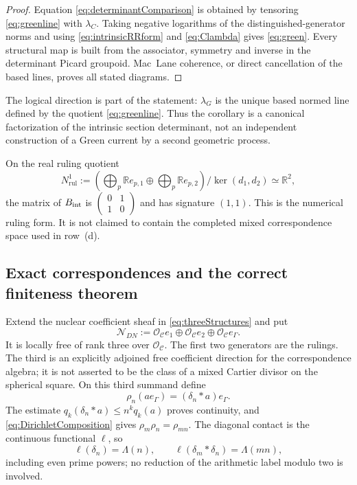 \documentclass[11pt]{amsart}
\theoremstyle{definition}
\theoremstyle{remark}
\newcommand{\R}{\mathbb R}
\begin{document}
\begin{proof}
Equation \eqref{eq:determinantComparison} is obtained by tensoring
\eqref{eq:greenline} with $\lambda_C$.  Taking negative logarithms of the
distinguished-generator norms and using \eqref{eq:intrinsicRRform} and
\eqref{eq:Clambda} gives \eqref{eq:green}.  Every structural map is built
from the associator, symmetry and inverse in the determinant Picard
groupoid.  Mac~Lane coherence, or direct cancellation of the based lines,
proves all stated diagrams.
\end{proof}

The logical direction is part of the statement: $\lambda_G$ is the unique
based normed line defined by the quotient \eqref{eq:greenline}.  Thus the
corollary is a canonical factorization of the intrinsic section determinant,
not an independent construction of a Green current by a second geometric
process.

On the real ruling quotient
\begin{equation}\label{eq:rulingquotient}
 N^1_{\mathrm{rul}}:=
 \left(\bigoplus_p\R e_{p,1}\oplus\bigoplus_p\R e_{p,2}\right)
       /\ker(d_1,d_2)\simeq\R^2,
\end{equation}
the matrix of $B_{\rm int}$ is
$\left(\begin{smallmatrix}0&1\\1&0\end{smallmatrix}\right)$ and has
signature $(1,1)$.  This is the numerical ruling form.  It is not claimed
to contain the completed mixed correspondence space used in row~(d).

\subsection{Exact correspondences and the correct finiteness theorem}

Extend the nuclear coefficient sheaf in \eqref{eq:threeStructures} and put
\begin{equation}\label{eq:NDN}
 \mathcal N_{DN}:=
 \mathcal O_{\mathcal C}e_1\oplus
 \mathcal O_{\mathcal C}e_2\oplus
 \mathcal O_{\mathcal C}e_\Gamma.
\end{equation}
It is locally free of rank three over $\mathcal O_{\mathcal C}$.  The first
two generators are the rulings.  The third is an explicitly adjoined free
coefficient direction for the correspondence algebra; it is not asserted
to be the class of a mixed Cartier divisor on the spherical square.  On
this third summand define
\begin{equation}\label{eq:nuclearAction}
 \rho_n(ae_\Gamma)=(\delta_n*a)e_\Gamma.
\end{equation}
The estimate $q_k(\delta_n*a)\leq n^kq_k(a)$ proves continuity, and
\eqref{eq:DirichletComposition} gives
$\rho_m\rho_n=\rho_{mn}$.  The diagonal contact is the continuous functional
$\ell$, so
\begin{equation}\label{eq:nuclearExactContact}
 \ell(\delta_n)=\Lambda(n),\qquad
 \ell(\delta_m*\delta_n)=\Lambda(mn),
\end{equation}
including even prime powers; no
reduction of the arithmetic label modulo two is involved.
\end{document}
